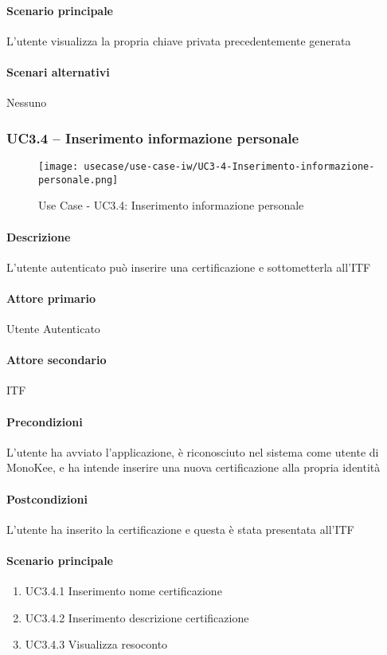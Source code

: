 \paragraph{Scenario principale}  
L’utente visualizza la propria chiave privata precedentemente generata
\paragraph{Scenari alternativi}  Nessuno



\subsubsection{UC3.4 – Inserimento informazione personale}
\begin{figure}[!htbp] 
    \centering 
    \texttt{[image: usecase/use-case-iw/UC3-4-Inserimento-informazione-personale.png]} 
    \caption{Use Case - UC3.4: Inserimento informazione personale}
\end{figure}

\paragraph{Descrizione}  L’utente autenticato può inserire una certificazione e sottometterla all’ITF
\paragraph{Attore primario}  Utente Autenticato
\paragraph{Attore secondario}  ITF
\paragraph{Precondizioni}  L’utente ha avviato l’applicazione, è riconosciuto nel sistema come utente di MonoKee, e ha intende inserire una nuova certificazione alla propria identità
\paragraph{Postcondizioni}  L’utente ha inserito la certificazione e questa è stata presentata all’ITF
\paragraph{Scenario principale}  
    \begin{enumerate}
        \item UC3.4.1 Inserimento nome certificazione
        \item UC3.4.2 Inserimento descrizione certificazione
        \item UC3.4.3 Visualizza resoconto
    \end{enumerate}
